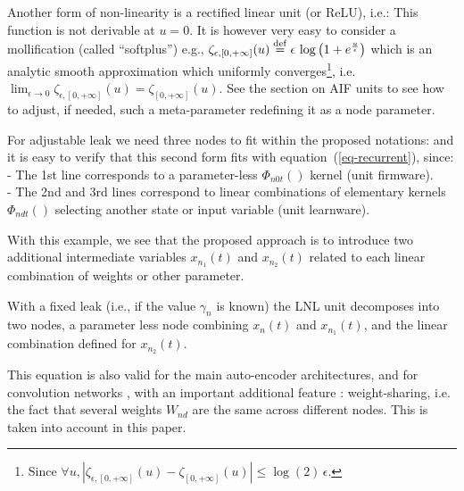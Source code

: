 Another form of non-linearity is a rectified linear unit (or ReLU), i.e.:
This function is not derivable at $u = 0$. It is however very easy to consider a mollification (called ``softplus'') e.g., $\zeta_{\epsilon, [0,+\infty]}(u) \stackrel {\rm def}{=} \epsilon \, \log\left(1 + e^{\frac{u}{\epsilon}}\right)$ which is an analytic smooth approximation which uniformly converges\footnote{Since $\forall u, |\zeta_{\epsilon, [0,+\infty]}(u) - \zeta_{[0,+\infty]}(u)| \leq \log(2) \, \epsilon$.}, i.e. $\lim_{\epsilon \rightarrow 0} \zeta_{\epsilon, [0,+\infty]}(u) = \zeta_{[0,+\infty]}(u)$. See the section on AIF units to see how to adjust, if needed, such a meta-parameter redefining it as a node parameter.

For adjustable leak we need three nodes to fit within the proposed notations:
and it is easy to verify that this second form fits with equation~(\ref{eq-recurrent}), since:
\\- The 1st line corresponds to a parameter-less $\Phi_{n0t}\left(\right)$ kernel (unit firmware).
\\- The 2nd and 3rd lines correspond to linear combinations of elementary kernels $\Phi_{ndt}\left(\right)$ selecting another state or input variable (unit learnware).

With this example, we see that the proposed approach is to introduce two additional intermediate variables $x_{n_1}(t)$ and $x_{n_2}(t)$ related to each linear combination of weights or other parameter.

With a fixed leak (i.e., if the value $\gamma_n$ is known) the LNL unit decomposes into two nodes, a parameter less node combining $x_n(t)$ and $x_{n_1}(t)$, and the linear combination defined for $x_{n_2}(t)$.

This equation is also valid for the main auto-encoder architectures, and for convolution networks \cite{Bengio:2009,Deng:2014}, with an important additional feature : weight-sharing, i.e. the fact that several weights $W_{nd}$ are the same across different nodes. This is taken into account in this paper.

